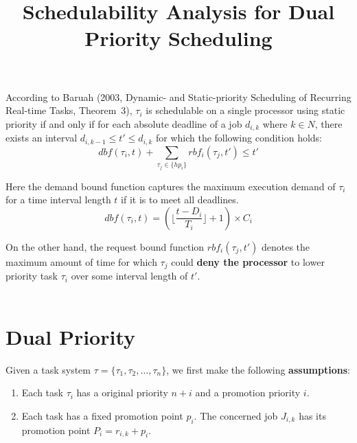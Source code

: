 \documentclass[12pt,conference,onecolumn]{IEEEtran}
\newcommand{\my}[1]{{\color{blue}{#1}}}
\begin{document}
  
\title{Schedulability Analysis for Dual Priority Scheduling}  
\maketitle  


According to Baruah (2003, Dynamic- and Static-priority Scheduling of Recurring Real-time Tasks, Theorem~3), $\tau_i$ is schedulable on a single processor using static priority if and only if for each absolute deadline of a job  $d_{i,k}$ where $k\in N$, there exists an interval $d_{i,k-1}\leq t'\leq d_{i,k}$ for which the following condition holds:
\begin{equation}
dbf(\tau_i,t)+\sum_{\tau_j\in\{hp_i\}}rbf_i(\tau_j,t')\leq t'	
\end{equation} 

Here the demand bound function captures the maximum execution demand of $\tau_i$ for a time interval length $t$ if it is to meet all deadlines.
\begin{equation}
dbf(\tau_i,t)=\left(\lfloor \frac{t-D_i}{T_i}\rfloor+1\right)\times C_i
\end{equation} 


On the other hand, the request bound function  $rbf_i(\tau_j,t')$ denotes the maximum amount of time for which $\tau_j$ could \textbf{deny the processor} to lower priority task $\tau_i$ over some interval length of $t'$. \\\\



\section{Dual Priority}
Given a task system $\tau=\{\tau_1,\tau_2,\ldots, \tau_n\}$, we first make the following \textbf{assumptions}:
\begin{enumerate}
	\item Each task  $\tau_i$ has a original priority $n+i$ and a promotion priority $i$.
	\item Each task has a fixed promotion point $p_i$. The concerned job $J_{i,k}$ has its promotion point $P_i=r_{i,k}+p_i$.
\end{enumerate}

\my{Existing request bound function  $rbf_i(\tau_j,t')$  denotes the maximum cumulative execution requirement by jobs of $\tau_j$ by $t'$ that have ready times within any time interval of duration $t'$.  However this is not the case in dual priority scheduling as shown in the following example.}
\end{document}
